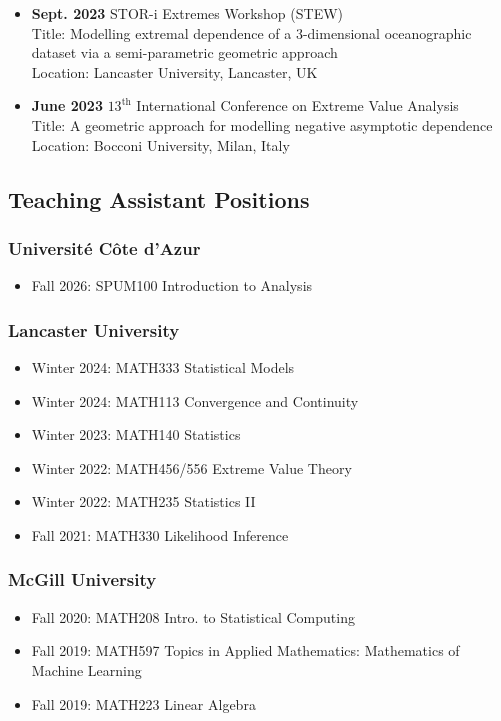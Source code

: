 \documentclass[11pt]{scrartcl}
\newcommand{\cvsection}[1]{\subsection*{#1}}
\begin{document}
\begin{itemize}[leftmargin=*,nosep]
    \item \textbf{Sept. 2023} STOR-i Extremes Workshop (STEW) \\
    Title: Modelling extremal dependence of a 3-dimensional oceanographic dataset via a semi-parametric geometric approach \\
    Location: Lancaster University, Lancaster, UK

    \item \textbf{June 2023} $13^{\text{th}}$ International Conference on Extreme Value Analysis \\
    Title: A geometric approach for modelling negative asymptotic dependence \\
    Location: Bocconi University, Milan, Italy
\end{itemize}

\cvsection{Teaching Assistant Positions}

\subsubsection*{Universit\'{e} C\^{o}te d'Azur}
\begin{itemize}[leftmargin=*,nosep]
    \item Fall 2026: SPUM100 Introduction to Analysis
\end{itemize}

\subsubsection*{Lancaster University}
\begin{itemize}[leftmargin=*,nosep]
    \item Winter 2024: MATH333 Statistical Models
    \item Winter 2024: MATH113 Convergence and Continuity
    \item Winter 2023: MATH140 Statistics
    \item Winter 2022: MATH456/556 Extreme Value Theory
    \item Winter 2022: MATH235 Statistics II
    \item Fall 2021: MATH330 Likelihood Inference
\end{itemize}

\subsubsection*{McGill University}
\begin{itemize}[leftmargin=*,nosep]
    \item Fall 2020: MATH208 Intro. to Statistical Computing
    \item Fall 2019: MATH597 Topics in Applied Mathematics: Mathematics of Machine Learning
    \item Fall 2019: MATH223 Linear Algebra
\end{itemize}
\end{document}
